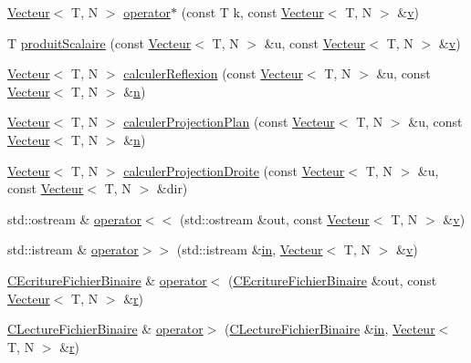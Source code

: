 \begin{DoxyCompactItemize}
\item 
\hyperlink{class_vecteur}{Vecteur}$<$ T, N $>$ \hyperlink{class_vecteur_aac39e0409c0da08a00dad3e2416ab5ea}{operator$\ast$} (const T k, const \hyperlink{class_vecteur}{Vecteur}$<$ T, N $>$ \&\hyperlink{glew_8h_a6509431814422c215a65946289dd98b8}{v})
\item 
T \hyperlink{class_vecteur_affc87c5768a1f6f1ccaf3acfeebdb69a}{produit\-Scalaire} (const \hyperlink{class_vecteur}{Vecteur}$<$ T, N $>$ \&u, const \hyperlink{class_vecteur}{Vecteur}$<$ T, N $>$ \&\hyperlink{glew_8h_a6509431814422c215a65946289dd98b8}{v})
\item 
\hyperlink{class_vecteur}{Vecteur}$<$ T, N $>$ \hyperlink{class_vecteur_ad2c770e2ca9e1bd65434222c38d2d936}{calculer\-Reflexion} (const \hyperlink{class_vecteur}{Vecteur}$<$ T, N $>$ \&u, const \hyperlink{class_vecteur}{Vecteur}$<$ T, N $>$ \&\hyperlink{glew_8h_a4cf5f6946cc0a65dbe0d2406017e469c}{n})
\item 
\hyperlink{class_vecteur}{Vecteur}$<$ T, N $>$ \hyperlink{class_vecteur_ace8741714bc2dbdf7139a69ff2ca836c}{calculer\-Projection\-Plan} (const \hyperlink{class_vecteur}{Vecteur}$<$ T, N $>$ \&u, const \hyperlink{class_vecteur}{Vecteur}$<$ T, N $>$ \&\hyperlink{glew_8h_a4cf5f6946cc0a65dbe0d2406017e469c}{n})
\item 
\hyperlink{class_vecteur}{Vecteur}$<$ T, N $>$ \hyperlink{class_vecteur_a9f368dc4afa8b946826484b58bdfc370}{calculer\-Projection\-Droite} (const \hyperlink{class_vecteur}{Vecteur}$<$ T, N $>$ \&u, const \hyperlink{class_vecteur}{Vecteur}$<$ T, N $>$ \&dir)
\item 
std\-::ostream \& \hyperlink{class_vecteur_afbf2befaa82119cb39ad76836fb1f5a5}{operator$<$$<$} (std\-::ostream \&out, const \hyperlink{class_vecteur}{Vecteur}$<$ T, N $>$ \&\hyperlink{glew_8h_a6509431814422c215a65946289dd98b8}{v})
\item 
std\-::istream \& \hyperlink{class_vecteur_a9f59dfe75ec01dca15119ee87d80352f}{operator$>$$>$} (std\-::istream \&\hyperlink{glew_8h_a83ad0ee7f1e06b59c90271716e689080}{in}, \hyperlink{class_vecteur}{Vecteur}$<$ T, N $>$ \&\hyperlink{glew_8h_a6509431814422c215a65946289dd98b8}{v})
\item 
\hyperlink{class_c_ecriture_fichier_binaire}{C\-Ecriture\-Fichier\-Binaire} \& \hyperlink{class_vecteur_abacd1aa27db76db0c5b31b8350155878}{operator$<$} (\hyperlink{class_c_ecriture_fichier_binaire}{C\-Ecriture\-Fichier\-Binaire} \&out, const \hyperlink{class_vecteur}{Vecteur}$<$ T, N $>$ \&\hyperlink{glew_8h_afc1d5bdb45878ca9a9eb0b223d646b35}{r})
\item 
\hyperlink{class_c_lecture_fichier_binaire}{C\-Lecture\-Fichier\-Binaire} \& \hyperlink{class_vecteur_a8019d8c25a0d412f51283351c814166f}{operator$>$} (\hyperlink{class_c_lecture_fichier_binaire}{C\-Lecture\-Fichier\-Binaire} \&\hyperlink{glew_8h_a83ad0ee7f1e06b59c90271716e689080}{in}, \hyperlink{class_vecteur}{Vecteur}$<$ T, N $>$ \&\hyperlink{glew_8h_afc1d5bdb45878ca9a9eb0b223d646b35}{r})
\end{DoxyCompactItemize}


